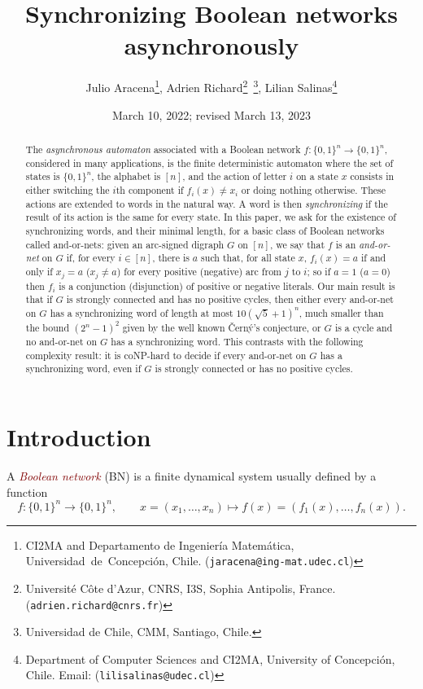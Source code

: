 \documentclass[11pt,letter]{article}
\title{Synchronizing Boolean networks asynchronously}
\date{March 10, 2022; revised March 13, 2023}
\author{
Julio Aracena\footnote{\scriptsize CI2MA and Departamento de Ingenier\'ia Matem\'atica, Universidad~de~Concepci\'on, Chile. ({\tt jaracena@ing-mat.udec.cl})},
Adrien Richard\footnote{\scriptsize Universit\'e Côte d’Azur, CNRS, I3S, Sophia Antipolis, France. ({\tt  adrien.richard@cnrs.fr})}~\footnote{\scriptsize Universidad de Chile, CMM, Santiago, Chile.},
Lilian Salinas\footnote{\scriptsize Department of Computer Sciences and CI2MA, University of Concepci\'on, Chile.  Email: ({\tt lilisalinas@udec.cl})}
}
\newcommand{\EM}[1]{{\em\textcolor{Maroon}{#1}}}
\newcommand{\B}{\{0,1\}}
\begin{document}

\maketitle


\begin{abstract}
The {\em asynchronous automaton} associated with a Boolean network $f:\B^n\to\B^n$, considered in many applications, is the finite deterministic automaton where the set of states is $\B^n$, the alphabet is $[n]$, and the action of letter $i$ on a state $x$ consists in either switching the $i$th component if $f_i(x)\neq x_i$ or doing nothing otherwise. These actions are extended to words in the natural way. A word is then {\em synchronizing} if the result of its action is the same for every state. In this paper, we ask for the existence of synchronizing words, and their minimal length, for a basic class of Boolean networks called and-or-nets: given an arc-signed digraph $G$ on $[n]$, we say that $f$ is an {\em and-or-net} on $G$ if, for every $i\in [n]$, there is $a$ such that, for all state $x$, $f_i(x)=a$ if and only if $x_j=a$ ($x_j\neq a$) for every positive (negative) arc from $j$ to $i$; so if $a=1$ ($a=0$) then $f_i$ is a conjunction (disjunction) of positive or negative literals. Our main result is that if $G$ is strongly connected and has no positive cycles, then either every and-or-net on $G$ has a synchronizing word of length at most $10(\sqrt{5}+1)^n$, much smaller than the bound $(2^n-1)^2$ given by the well known \v{C}ern\'y's conjecture, or $G$ is a cycle and no and-or-net on $G$ has a synchronizing word. This contrasts with the following complexity result:  it is coNP-hard to decide if every and-or-net on $G$ has a synchronizing word, even if $G$ is strongly connected or has no positive cycles. 
\end{abstract}

\section{Introduction}

A \EM{Boolean network} (BN) is a finite dynamical system usually defined by a function  
\[
f:\B^n\to\B^n,\qquad x=(x_1,\dots,x_n)\mapsto f(x)=(f_1(x),\dots,f_n(x)).
\]
\end{document}

